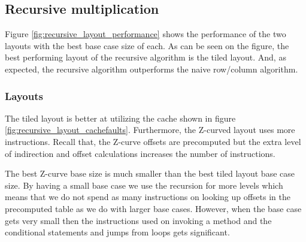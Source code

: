 

\subsection{Recursive multiplication}

Figure \ref{fig:recursive_layout_performance} shows the performance of the two layouts with the best base case size of each. As can be seen on the figure, the best performing layout of the recursive algorithm is the tiled layout. And, as expected, the recursive algorithm outperforms the naive row/column algorithm.

\subsubsection{Layouts}

The tiled layout is better at utilizing the cache shown in figure \ref{fig:recursive_layout_cachefaults}. Furthermore, the Z-curved layout uses more instructions. Recall that, the Z-curve offsets are precomputed but the extra level of indirection and offset calculations increases the number of instructions.

The best Z-curve base size is much smaller than the best tiled layout base case size. By having a small base case we use the recursion for more levels which means that we do not spend as many instructions on looking up offsets in the precomputed table as we do with larger base cases. However, when the base case gets very small then the instructions used on invoking a method and the conditional statements and jumps from loops gets significant.





